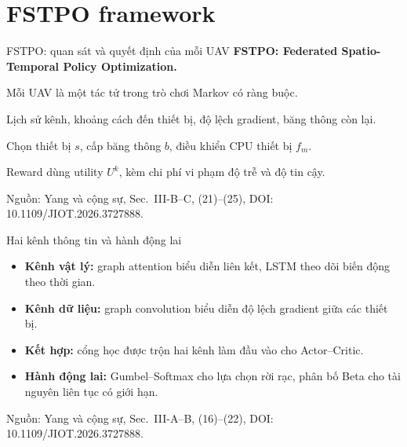\documentclass[aspectratio=169,11pt]{beamer}
\newcommand{\source}[1]{\par\vfill{\tiny\color{Muted}Nguồn: #1\par}}
\newcommand{\paperref}[1]{\source{Yang và cộng sự, Sec.~#1, DOI: 10.1109/JIOT.2026.3727888.}}
\begin{document}
\section{FSTPO framework}

\begin{frame}{FSTPO: quan sát và quyết định của mỗi UAV}
  \textbf{FSTPO: Federated Spatio-Temporal Policy Optimization.}

  Mỗi UAV là một tác tử trong trò chơi Markov có ràng buộc.
  \begin{description}
    \setlength{\itemsep}{0.7em}
    \item[Quan sát] Lịch sử kênh, khoảng cách đến thiết bị, độ lệch gradient, băng thông còn lại.
    \item[Hành động] Chọn thiết bị $s$, cấp băng thông $b$, điều khiển CPU thiết bị $f_m$.
    \item[Đánh giá] Reward dùng utility $U^k$, kèm chi phí vi phạm độ trễ và độ tin cậy.
  \end{description}
  \paperref{III-B--C, (21)--(25)}
\end{frame}

\begin{frame}{Hai kênh thông tin và hành động lai}
  \begin{itemize}
    \setlength{\itemsep}{0.8em}
    \item \textbf{Kênh vật lý:} graph attention biểu diễn liên kết, LSTM theo dõi biến động theo thời gian.
    \item \textbf{Kênh dữ liệu:} graph convolution biểu diễn độ lệch gradient giữa các thiết bị.
    \item \textbf{Kết hợp:} cổng học được trộn hai kênh làm đầu vào cho Actor--Critic.
    \item \textbf{Hành động lai:} Gumbel--Softmax cho lựa chọn rời rạc, phân bố Beta cho tài nguyên liên tục có giới hạn.
  \end{itemize}
  \paperref{III-A--B, (16)--(22)}
\end{frame}
\end{document}
